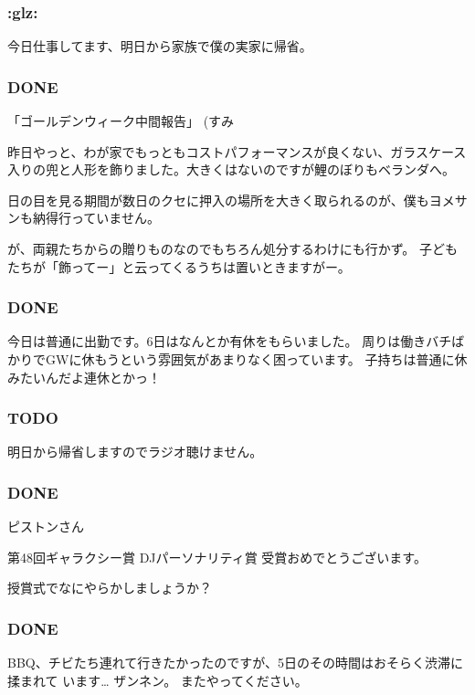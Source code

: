 \documentclass[11pt]{article}
\begin{document}
\subsubsection{\textbf{:glz:}}
\label{sec-127_1_1}

今日仕事してます、明日から家族で僕の実家に帰省。
\subsubsection{\textbf{DONE}}
\label{sec-127_1_2}

「ゴールデンウィーク中間報告」 (すみ

昨日やっと、わが家でもっともコストパフォーマンスが良くない、ガラスケース入りの兜と人形を飾りました。大きくはないのですが鯉のぼりもベランダへ。

日の目を見る期間が数日のクセに押入の場所を大きく取られるのが、僕もヨメサンも納得行っていません。

が、両親たちからの贈りものなのでもちろん処分するわけにも行かず。
子どもたちが「飾ってー」と云ってくるうちは置いときますがー。
\subsubsection{\textbf{DONE}}
\label{sec-127_1_3}

今日は普通に出勤です。6日はなんとか有休をもらいました。
周りは働きバチばかりでGWに休もうという雰囲気があまりなく困っています。
子持ちは普通に休みたいんだよ連休とかっ！
\subsubsection{\textbf{TODO}}
\label{sec-127_1_4}

明日から帰省しますのでラジオ聴けません。
\subsubsection{\textbf{DONE}}
\label{sec-127_1_5}

ピストンさん

第48回ギャラクシー賞
DJパーソナリティ賞 受賞おめでとうございます。

授賞式でなにやらかしましょうか？
\subsubsection{\textbf{DONE}}
\label{sec-127_1_6}

BBQ、チビたち連れて行きたかったのですが、5日のその時間はおそらく渋滞に揉まれて
います\ldots{} ザンネン。
またやってください。
\end{document}
